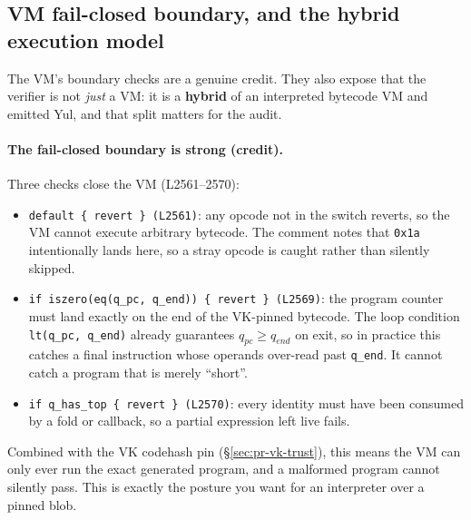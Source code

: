 \subsection{VM fail-closed boundary, and the hybrid execution model}
\label{sec:pr-vm-hybrid}

The VM's boundary checks are a genuine credit. They also expose
that the verifier is not \emph{just} a VM: it is a
\textbf{hybrid} of an interpreted bytecode VM and emitted Yul, and
that split matters for the audit.

\paragraph{The fail-closed boundary is strong (credit).}
Three checks close the VM (L2561--2570):
\begin{itemize}[leftmargin=1.4em,itemsep=2pt]
\item \texttt{default \{ revert \} (L2561)}: any opcode not in
  the switch reverts, so the VM cannot execute arbitrary
  bytecode. The comment notes that \texttt{0x1a} intentionally lands
  here, so a stray opcode is caught rather than silently skipped.
\item \texttt{if iszero(eq(q\_\allowbreak{}pc, q\_\allowbreak{}end)) \{ revert \} (L2569)}:
  the program counter must land exactly on the end of the
  VK-pinned bytecode. The loop condition \texttt{lt(q\_pc, q\_end)}
  already guarantees $q_{pc}\ge q_{end}$ on exit, so in practice this
  catches a final instruction whose operands over-read past
  \texttt{q\_end}. It cannot catch a program that is merely
  ``short''.
\item \texttt{if q\_\allowbreak{}has\_\allowbreak{}top \{ revert \} (L2570)}: every
  identity must have been consumed by a fold or callback, so a
  partial expression left live fails.
\end{itemize}
Combined with the VK codehash pin (\S\ref{sec:pr-vk-trust}), this
means the VM can only ever run the exact generated program, and a
malformed program cannot silently pass. This is exactly the
posture you want for an interpreter over a pinned blob.

